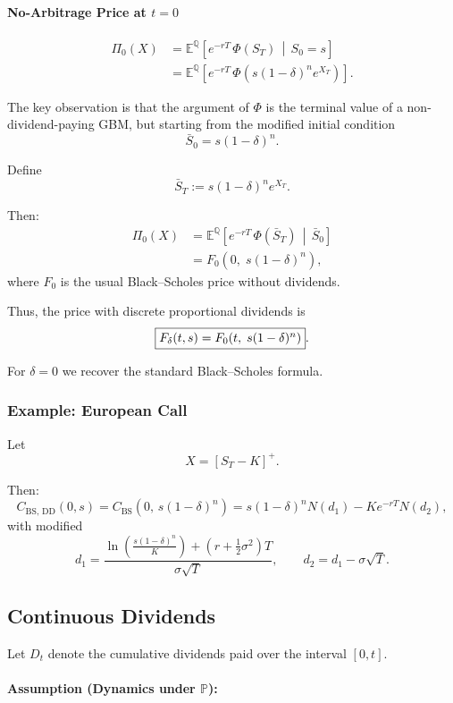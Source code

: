 \documentclass[12pt,a4paper]{article}
\theoremstyle{definition}
\begin{document}
\paragraph{No-Arbitrage Price at $t=0$}

\[
\begin{aligned}
\Pi_0(X) &= \mathbb{E}^\mathbb{Q}\left[e^{-rT}\,\Phi(S_T)\,\middle|\,S_0=s\right] \\
&= \mathbb{E}^\mathbb{Q}\left[e^{-rT}\,\Phi\left(s(1-\delta)^n e^{X_T}\right)\right].
\end{aligned}
\]

The key observation is that the argument of $\Phi$ is the terminal value of a non-dividend-paying GBM, but starting from the modified initial condition
\[
\bar{S}_0 = s(1-\delta)^n.
\]

Define
\[
\bar{S}_T := s(1-\delta)^n e^{X_T}.
\]

Then:
\[
\begin{aligned}
\Pi_0(X) &= \mathbb{E}^\mathbb{Q}\left[e^{-rT}\,\Phi(\bar{S}_T)\,\middle|\,\bar{S}_0\right] \\
&= F_0(0,\; s(1-\delta)^n),
\end{aligned}
\]
where $F_0$ is the usual Black--Scholes price without dividends.

Thus, the price with discrete proportional dividends is
\[
\fbox{$F_\delta(t, s) = F_0(t,\; s(1-\delta)^n)$}.
\]

For $\delta=0$ we recover the standard Black--Scholes formula.

\subsubsection{Example: European Call}

Let
\[
X = [S_T - K]^+.
\]

Then:
\[
C_{\text{BS, DD}}(0, s) = C_{\text{BS}}(0,\, s(1-\delta)^n) = s(1-\delta)^n N(d_1) - K e^{-rT} N(d_2),
\]
with modified
\[
d_1 = \frac{\ln\!\left( \frac{s(1-\delta)^n}{K} \right) + (r + \tfrac{1}{2}\sigma^2)T}{\sigma \sqrt{T}}, \qquad d_2 = d_1 - \sigma \sqrt{T}.
\]

\subsection{Continuous Dividends}

Let $D_t$ denote the cumulative dividends paid over the interval $[0,t]$.

\paragraph{Assumption (Dynamics under $\mathbb{P}$):}
\end{document}
